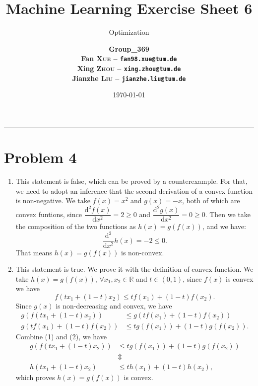 \documentclass[12pt]{scrartcl}
\title{\large Machine Learning Exercise Sheet 6}
\subtitle{\Large Optimization}
\author{\large\bfseries Group\_369 \\
        \large Fan \textsc{Xue} -- \texttt{fan98.xue@tum.de} \\
        \large Xing \textsc{Zhou} -- \texttt{xing.zhou@tum.de} \\
        \large Jianzhe \textsc{Liu} -- \texttt{jianzhe.liu@tum.de}}
\date{\large \today}
\newcommand\R{\mathbb{R}}
\begin{document}
  \maketitle
  \vspace{-1cm}
  \noindent\rule{\textwidth}{0.4pt}
  \section*{Problem 4}

  \begin{enumerate}[label=\alph*)]
    \item This statement is false, which can be proved by a counterexample. For that, we need to adopt an inference that the second derivation of a convex function is non-negative.
    We take $f(x)=x^2$ and $g(x)=-x$, both of which are convex funtions, since $\dfrac{\mathrm{d}^{2}f(x)}{\mathrm{d}x^{2}}=2 \ge 0$ and $\dfrac{\mathrm{d^{2}}g(x)}{\mathrm{d}x^{2}}=0 \ge 0$.
    Then we take the composition of the two functions as $h(x)=g(f(x))$, and we have:
    \begin{equation*}
      \frac{\mathrm{d^{2}}}{\mathrm{d}x^{2}}h(x)=-2 \le 0.
    \end{equation*}
    That means $h(x)=g(f(x))$ is non-convex.
    \item This statement is true. We prove it with the definition of convex function. We take $h(x)=g(f(x))$, 
     $\forall x_{1},x_{2}\in \R$ and $t \in (0,1)$, since $f(x)$ is convex we have
    \begin{equation*}
      f\left( tx_{1}+(1-t)x_{2} \right) \le tf\left( x_{1} \right) + (1-t)f\left( x_{2} \right).
    \end{equation*}
    Since $g(x)$ is non-decreasing and convex, we have
    \begin{align}
      g\left(f\left( tx_{1}+(1-t)x_{2} \right)\right) &\le g\left( tf\left( x_{1} \right) + (1-t)f\left( x_{2} \right) \right) \\
      g\left( tf(x_1) + (1-t)f(x_2) \right) &\le tg\left( f(x_1) \right) + (1-t)g\left( f(x_2) \right).
    \end{align}
    Combine (1) and (2), we have
    \begin{align*}
      g\left(f\left( tx_{1}+(1-t)x_{2} \right)\right) &\le tg\left( f(x_1) \right) + (1-t)g\left( f(x_2) \right) \\
      &\Updownarrow \\
      h\left( tx_{1}+(1-t)x_{2} \right) &\le th(x_1) + (1-t)h(x_2),
    \end{align*}
    which proves $h(x)=g(f(x))$ is convex.
  \end{enumerate}
\end{document}
